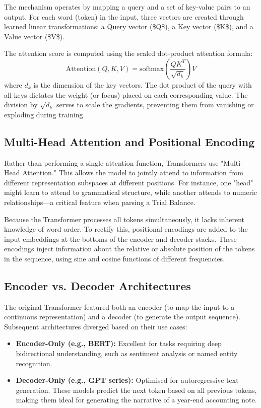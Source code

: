 The mechanism operates by mapping a query and a set of key-value pairs to an output. For each word (token) in the input, three vectors are created through learned linear transformations: a Query vector (\$Q\$), a Key vector (\$K\$), and a Value vector (\$V\$). 

The attention score is computed using the scaled dot-product attention formula:
\begin{equation}
\text{Attention}(Q, K, V) = \text{softmax}\left(\frac{QK^T}{\sqrt{d_k}}\right)V
\end{equation}
where $d_k$ is the dimension of the key vectors. The dot product of the query with all keys dictates the weight (or focus) placed on each corresponding value. The division by $\sqrt{d_k}$ serves to scale the gradients, preventing them from vanishing or exploding during training.

\subsection{Multi-Head Attention and Positional Encoding}
Rather than performing a single attention function, Transformers use "Multi-Head Attention." This allows the model to jointly attend to information from different representation subspaces at different positions. For instance, one "head" might learn to attend to grammatical structure, while another attends to numeric relationships—a critical feature when parsing a Trial Balance.

Because the Transformer processes all tokens simultaneously, it lacks inherent knowledge of word order. To rectify this, positional encodings are added to the input embeddings at the bottoms of the encoder and decoder stacks. These encodings inject information about the relative or absolute position of the tokens in the sequence, using sine and cosine functions of different frequencies.

\subsection{Encoder vs. Decoder Architectures}
The original Transformer featured both an encoder (to map the input to a continuous representation) and a decoder (to generate the output sequence). Subsequent architectures diverged based on their use cases:
\begin{itemize}
    \item \textbf{Encoder-Only (e.g., BERT):} Excellent for tasks requiring deep bidirectional understanding, such as sentiment analysis or named entity recognition.
    \item \textbf{Decoder-Only (e.g., GPT series):} Optimised for autoregressive text generation. These models predict the next token based on all previous tokens, making them ideal for generating the narrative of a year-end accounting note.
\end{itemize}

